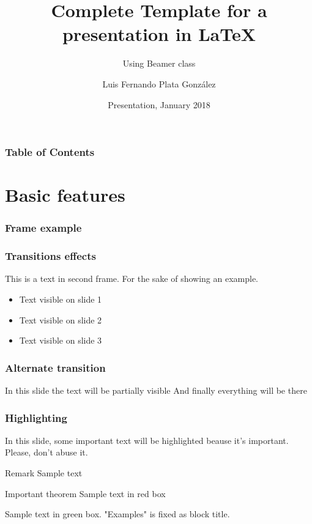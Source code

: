 \documentclass[12pt]{beamer}
\title[Beamer Template] %
{Complete Template for a presentation in LaTeX}
\subtitle{Using Beamer class}
\author[Plata]
{Luis Fernando Plata González\inst{1}}
\institute[TEC] %
{
  \inst{1}%
  Computer Science Department\\
  Tecnológico de Monterrey
}
\date[2018] %
{Presentation, January 2018}
\begin{document}
\frame{\titlepage}

\begin{frame}
\frametitle{Table of Contents}
\tableofcontents
\end{frame}

\section{Basic features}
\begin{frame}
\frametitle{Frame example}
\blindtext[1]
\end{frame}


\begin{frame}
\frametitle{Transitions effects}
This is a text in second frame. 
For the sake of showing an example.
 
\begin{itemize}
 \item<1-> Text visible on slide 1
 \item<2-> Text visible on slide 2
 \item<3-> Text visible on slide 3
\end{itemize}
\end{frame}


\begin{frame}
\frametitle{Alternate transition}
 In this slide \pause
 the text will be partially visible \pause
 And finally everything will be there
\end{frame}


\begin{frame}
\frametitle{Highlighting}
 
In this slide, some important text will be
\alert{highlighted} beause it's important.
Please, don't abuse it.
 
\begin{block}{Remark}
Sample text
\end{block}
 
\begin{alertblock}{Important theorem}
Sample text in red box
\end{alertblock}
 
\begin{example}
Sample text in green box. "Examples" is fixed as block title.
\end{example}
\end{frame}
\end{document}
